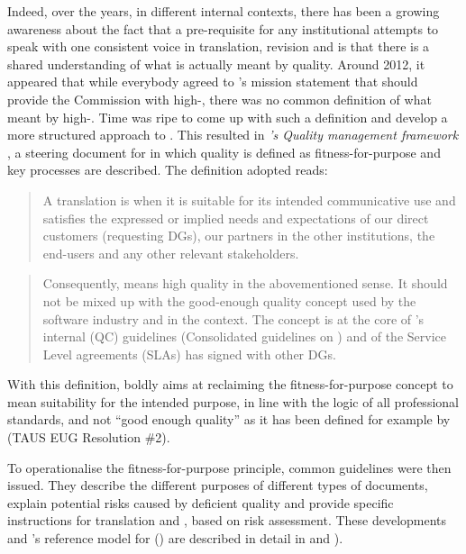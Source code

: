 \documentclass[output=paper]{langsci/langscibook}
\begin{document}
Indeed, over the years, in different internal contexts, there has been a growing awareness about the fact that a pre-requisite for any institutional attempts to speak with one consistent voice in translation, revision and  is that there is a shared understanding of what is actually meant by quality. Around 2012, it appeared that while everybody agreed to \citeauthor{DGT2014}'s mission statement that \citeauthor{DGT2014} should provide the Commission with high-, there was no common definition of what  meant by high-. Time was ripe to come up with such a definition and develop a more structured approach to . This resulted in \textit{'s Quality management framework} \citep{DGT2014}, a steering document for  in which quality is defined as fitness-for-purpose and key processes are described. The definition adopted reads:

\begin{quote}
A translation is  when it is suitable for its intended communicative use and satisfies the expressed or implied needs and expectations of our direct customers (requesting DGs), our partners in the other  institutions, the end-users and any other relevant stakeholders. 
\end{quote}

\begin{quote}
Consequently,  means high quality in the abovementioned sense. It should not be mixed up with the good-enough quality concept used by the software industry and in the  context. The  concept is at the core of ’s internal  (QC) guidelines (Consolidated guidelines on ) and of the Service Level agreements (SLAs)  has signed with other DGs.
\end{quote}

With this definition,  boldly aims at reclaiming the fitness-for-purpose concept to mean suitability for the intended purpose, in line with the logic of all professional standards, and not ``good enough quality'' as it has been defined for example by \citeauthor{TAUS2017dqf} (TAUS EUG Resolution \#2).

To operationalise the fitness-for-purpose principle, common  guidelines \citep{DGT2015a} were then issued. They describe the different purposes of different types of  documents, explain potential risks caused by deficient quality and provide  specific instructions for translation and , based on risk assessment. These developments and 's reference model for  () are described in detail in \citet{Strandvik2017} and \citet{Druganforthcoming}). 
\end{document}
